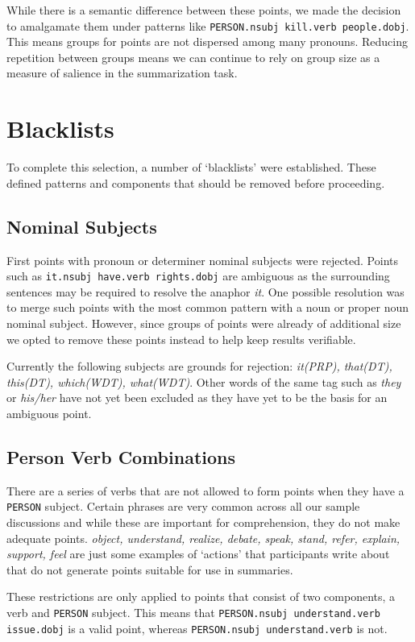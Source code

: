     While there is a semantic difference between these points, we made the decision to amalgamate them under patterns like \texttt{PERSON.nsubj kill.verb people.dobj}. This means groups for points are not dispersed among many pronouns. Reducing repetition between groups means we can continue to rely on group size as a measure of salience in the summarization task.

  \section{Blacklists}
    To complete this selection, a number of `blacklists' were established. These defined patterns and components that should be removed before proceeding.
    \subsection{Nominal Subjects}
      First points with pronoun or determiner nominal subjects were rejected. Points such as \texttt{it.nsubj have.verb rights.dobj} are ambiguous as the surrounding sentences may be required to resolve the anaphor \textit{it}. One possible resolution was to merge such points with the most common pattern with a noun or proper noun nominal subject. However, since groups of points were already of additional size we opted to remove these points instead to help keep results verifiable.

      Currently the following subjects are grounds for rejection: \textit{it(PRP), that(DT), this(DT), which(WDT), what(WDT)}. Other words of the same tag such as \textit{they} or \textit{his/her} have not yet been excluded as they have yet to be the basis for an ambiguous point.

    \subsection{Person Verb Combinations}
      There are a series of verbs that are not allowed to form points when they have a \texttt{PERSON} subject. Certain phrases are very common across all our sample discussions and while these are important for comprehension, they do not make adequate points. \textit{object, understand, realize, debate, speak, stand, refer, explain, support, feel} are just some examples of `actions' that participants write about that do not generate points suitable for use in summaries.

      These restrictions are only applied to points that consist of two components, a verb and \texttt{PERSON} subject. This means that \texttt{PERSON.nsubj understand.verb issue.dobj} is a valid point, whereas \texttt{PERSON.nsubj understand.verb} is not.

